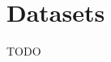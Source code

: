 \documentclass[utf8]{frontiers_suppmat} %
\begin{document}
\onecolumn
{}

\title[Supplementary Material]{{}}


\maketitle


\section{Datasets}

TODO










%
\end{document}
